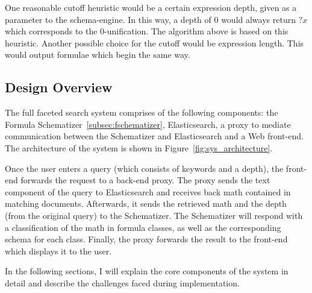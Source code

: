 \documentclass[a4paper,11pt,oneside]{article}
\begin{document}
One reasonable cutoff heuristic would be a certain expression depth, given as a
parameter to the schema-engine.  In this way, a depth of 0 would always return
$?x$ which corresponds to the 0-unification. The algorithm above is based on
this heuristic.  Another possible choice for the cutoff would be expression
length.  This would output formulae which begin the same way.

\subsection{Design Overview}\label{subsec:design_overview}
The full faceted search system comprises of the following components: the
Formula Schematizer~\ref{subsec:fschematizer}, Elasticsearch, a proxy to
mediate communication between the Schematizer and Elasticsearch and a Web
front-end. The architecture of the system is shown in
Figure~\ref{fig:sys_architecture}.

Once the user enters a query (which consists of keywords and a depth), the
front-end forwards the request to a back-end proxy. The proxy sends the
text component of the query to Elasticsearch and receives back math
contained in matching documents. Afterwards, it sends the retrieved math
and the depth (from the original query) to the Schematizer. The Schematizer
will respond with a classification of the math in formula classes, as well
as the corresponding schema for each class. Finally, the proxy forwards the
result to the front-end which displays it to the user.

In the following sections, I will explain the core components of
the system in detail and describe the challenges faced during
implementation.
\end{document}
